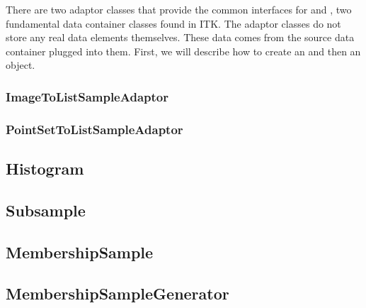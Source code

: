 There are two adaptor classes that provide the common
 interfaces for  and
, two fundamental data container classes found in ITK. The
adaptor classes do not store any real data elements themselves. These data
comes from the source data container plugged into them. First, we will
describe how to create an
 and then an
 object.

\subsubsection{ImageToListSampleAdaptor}
\label{sec:ImageToListSampleAdaptor}

\ifitkFullVersion 

\fi

\subsubsection{PointSetToListSampleAdaptor}
\label{sec:PointSetToListSampleAdaptor}

\ifitkFullVersion 

\fi

\ifitkFullVersion 

\fi


\subsection{Histogram}
\label{sec:Histogram}

\ifitkFullVersion 

\fi

\subsection{Subsample}
\label{sec:Subsample}

\ifitkFullVersion 

\fi

\subsection{MembershipSample}
\label{sec:MembershipSample}

\ifitkFullVersion 

\fi

\subsection{MembershipSampleGenerator}
\label{sec:MembershipSampleGenerator}

